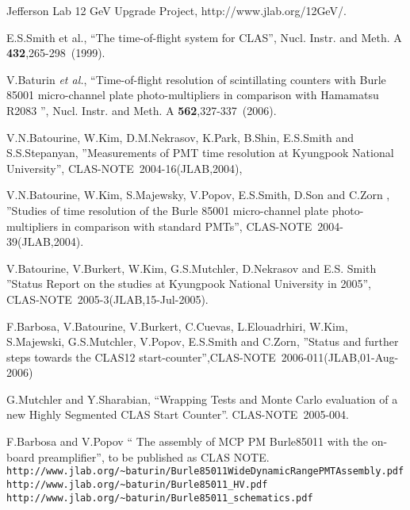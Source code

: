 
\begin{thebibliography}{99}

 Jefferson Lab 12 GeV Upgrade Project, http://www.jlab.org/12GeV/.

 E.S.Smith et al., ``The time-of-flight system for CLAS'',  Nucl. Instr. and Meth. A \textbf{432},265-298~(1999).


 V.Baturin {\it et al.}, ``Time-of-flight resolution of scintillating counters with
Burle 85001 micro-channel plate photo-multipliers  in comparison with Hamamatsu R2083 '',
Nucl. Instr. and Meth. A \textbf{562},327-337~(2006).


 V.N.Batourine, W.Kim, D.M.Nekrasov, K.Park, B.Shin, E.S.Smith
 and S.S.Stepanyan,
''Measurements of PMT time resolution at Kyungpook National University'',
CLAS-NOTE~2004-16(JLAB,2004),

 V.N.Batourine, W.Kim, S.Majewsky, V.Popov, E.S.Smith, 
D.Son and C.Zorn ,
''Studies of time resolution of the Burle 85001 micro-channel 
plate photo-multipliers in comparison with standard PMTs'', CLAS-NOTE~2004-39(JLAB,2004).

  V.Batourine, V.Burkert, W.Kim, G.S.Mutchler,  D.Nekrasov and E.S. Smith
''Status Report on the studies at Kyungpook National University in 2005'', 
CLAS-NOTE~2005-3(JLAB,15-Jul-2005).

  F.Barbosa, V.Batourine, V.Burkert, C.Cuevas,
 L.Elouadrhiri, W.Kim, S.Majewski, G.S.Mutchler, V.Popov, E.S.Smith and C.Zorn,
''Status and further steps towards the CLAS12 start-counter'',CLAS-NOTE~2006-011(JLAB,01-Aug-2006)





 G.Mutchler and Y.Sharabian, ``Wrapping Tests and Monte Carlo 
evaluation of a new Highly Segmented CLAS Start Counter''. CLAS-NOTE~2005-004.




  F.Barbosa and V.Popov
 `` The assembly of MCP PM Burle85011 with the on-board preamplifier'', 
to be published as CLAS NOTE.
\verb|http://www.jlab.org/~baturin/Burle85011WideDynamicRangePMTAssembly.pdf|
\verb|http://www.jlab.org/~baturin/Burle85011_HV.pdf|
\verb|http://www.jlab.org/~baturin/Burle85011_schematics.pdf|



\end{thebibliography}
